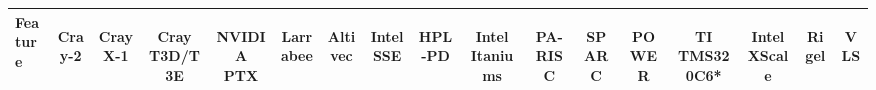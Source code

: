 \begin{table}[t] 
\begin{tiny}
\begin{tabular}{|l|c|c|c||c|c|c|c||c|c||c|c|c||c|c||c|c|} 
\hline Feature & 
               {\begin{sideways}Cray-2\end{sideways}} & 
               {\begin{sideways}Cray X-1\end{sideways}} & 
               {\begin{sideways}Cray T3D/T3E\end{sideways}} & 
               
               {\begin{sideways}NVIDIA PTX\end{sideways}} & 
               {\begin{sideways}Larrabee\end{sideways}} & 
               {\begin{sideways}Altivec\end{sideways}} & 
               {\begin{sideways}Intel SSE\end{sideways}} & 
               
               {\begin{sideways}HPL-PD\end{sideways}} & 
               {\begin{sideways}Intel Itaniums\end{sideways}} & 
               
               {\begin{sideways}PA-RISC\end{sideways}} & 
               {\begin{sideways}SPARC\end{sideways}} & 
               {\begin{sideways}POWER\end{sideways}} & 
               
               {\begin{sideways}TI TMS320C6*\end{sideways}} &
               {\begin{sideways}Intel XScale\end{sideways}} & 
               
               {\begin{sideways}Rigel\end{sideways}} & 
               {\begin{sideways}VLS\end{sideways}} 
               \\ \hline \hline
               

\end{tabular}
\end{tiny}
\end{table}
